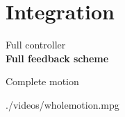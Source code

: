 \section{Integration}

\setcounter{subsection}{1}
\begin{frame}{Full controller}
  \vspace*{0.5cm}
  \hspace*{-0.7cm}
  \scalebox{1.0}{} \\
%
  \textbf{\color{blue}Full feedback scheme}
%
\end{frame}

\begin{frame}{Complete motion}
\vspace*{0.6cm}
  \begin{center}
    {./videos/wholemotion.mpg}
  \end{center}
\end{frame}